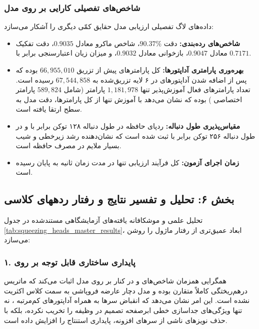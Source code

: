 \subsubsection*{شاخص‌های تفصیلی کارایی بر روی مدل }
داده‌های لاگ تفصیلی ارزیابی مدل  حقایق کمّی دیگری را آشکار می‌سازد:
\begin{itemize}
    \item \textbf{شاخص‌های رده‌بندی:} دقت $90.37\%$، شاخص ماکرو  معادل $0.9035$، دقت تفکیک  معادل $0.9047$، بازخوانی  معادل $0.9032$، و میزان زیان اعتبارسنجی برابر با $0.7171$.
    \item \textbf{بهره‌وری پارامتری آداپتورها:} کل پارامترهای پیش از تزریق $66,955,010$ بوده که پس از اضافه شدن آداپتورهای  در ۶ لایه تزریق‌شده به $67,544,858$ رسیده است. تعداد پارامترهای فعال آموزش‌پذیر تنها $1,181,978$ پارامتر (شامل $589,824$ پارامتر اختصاصی ) بوده که نشان می‌دهد با آموزش تنها  از کل پارامترها، دقت مدل به سطح  ارتقا یافته است.
    \item \textbf{مقیاس‌پذیری طول دنباله:} ردپای حافظه در طول دنباله ۱۲۸ توکن برابر با  و در طول دنباله ۲۵۶ توکن برابر با  ثبت شده است که نشان‌دهنده رشد زیرخطی و شیب بسیار ملایم در مصرف حافظه است.
    \item \textbf{زمان اجرای آزمون:} کل فرآیند ارزیابی تنها در مدت زمان  ثانیه به پایان رسیده است.
\end{itemize}

\subsection*{بخش ۶: تحلیل و تفسیر نتایج و رفتار ردههای کلاسی }
تحلیل علمی و موشکافانه یافته‌های آزمایشگاهی مستندشده در جدول \ref{tab:squeezing_heads_master_results}، ابعاد عمیق‌تری از رفتار ماژول  را روشن می‌سازد:

\subsubsection*{۱. پایداری ساختاری قابل توجه بر روی }
همگرایی همزمان شاخص‌های  و  در کنار  بر روی مدل  اثبات می‌کند که ماتریس درهم‌ریختگی  کاملاً متقارن بوده و مدل دچار عارضه فروپاشی به سمت کلاس اکثریت  نشده است. این امر نشان می‌دهد که انقباض سرها به همراه آداپتورهای کم‌مرتبه ، نه تنها ویژگی‌های جداسازی خطی ابرصفحه تصمیم در وظیفه  را تخریب نکرده، بلکه با حذف نویزهای ناشی از سرهای افزونه، پایداری استنتاج را افزایش داده است.

